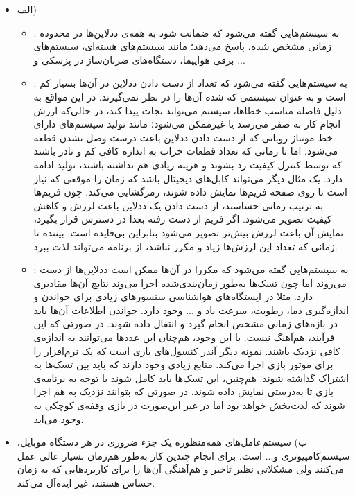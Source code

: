 

\begin{itemize}
	\item الف)
	\begin{itemize}
		\item {}: به سیستم‌هایی گفته می‌شود که ضمانت شود به همه‌ی ددلاین‌ها در محدوده زمانی مشخص شده، پاسخ می‌دهد؛ مانند سیستم‌های هسته‌ای، سیستم‌های برقی هواپیما، دستگاه‌های ضربان‌ساز در پزسکی و ...
		\item {}:
		به سیستم‌هایی گفته می‌شود که تعداد از دست دادن ددلاین‌ در آن‌ها بسیار کم است و به عنوان سیستمی که  شده آن‌ها را در نظر نمی‌گیرند.  در این مواقع به دلیل فاصله مناسب خطاها، سیستم می‌تواند نجات پیدا کند، در حالی‌که ارزش انجام کار به صفر می‌رسد یا غیرممکن می‌شود؛ مانند تولید سیستم‌های دارای خط مونتاژ روباتی که از دست دادن ددلاین باعث درست وصل نشدن قطعه می‌شود. اما تا زمانی که تعداد قطعات خراب به اندازه کافی کم و نادر باشند که  توسط کنترل کیفیت رد بشوند و هزینه زیادی هم نداشته باشند، تولید ادامه دارد. یک مثال دیگر می‌تواند کابل‌های دیجیتال  باشد که زمان را موقعی که نیاز است تا روی صفحه فریم‌ها نمایش داده شوند، رمزگشایی می‌کند. چون فریم‌ها به ترتیب زمانی حساسند، از دست دادن یک ددلاین باعث لرزش و کاهش کیفیت تصویر می‌شود. اگر فریم از دست رفته بعدا در دسترس قرار بگیرد، نمایش آن باعث لرزش بیش‌تر تصویر می‌شود بنابراین بی‌فایده است. بیننده تا زمانی که تعداد این لرزش‌ها زیاد و مکرر نباشد، از برنامه می‌تواند لذت ببرد.
		\item {}:
		به سیستم‌هایی گفته می‌شود که مکررا در آن‌ها ممکن است ددلاین‌ها از دست می‌روند اما چون تسک‌ها به‌طور زمان‌بندی‌شده اجرا می‌وند نتایج آن‌ها مقادیری دارد. 
		مثلا در ایستگاه‌های هواشناسی سنسورهای زیادی برای خواندن و اندازه‌گیری دما، رطوبت، سرعت باد و ... وجود دارد. خواندن اطلاعات آن‌ها باید در بازه‌های زمانی مشخص انجام گیرد و انتقال داده شوند. در صورتی که این فرآیند، هم‌آهنگ نیست. با این وجود، هم‌چنان این عددها می‌توانند به اندازه‌ی کافی نزدیک باشند. نمونه دیگر  آندر کنسول‌های بازی است که یک نرم‌افزار را برای موتور بازی اجرا می‌کند. منابع زیادی وجود دارند که باید بین تسک‌ها به اشتراک گذاشته شوند. هم‌چنین، این تسک‌ها باید کامل شوند با توجه به برنامه‌ی بازی تا به‌درستی نمایش داده شوند. در صورتی که بتوانند نزدیک به هم اجرا شوند که لذت‌بخش خواهد بود اما در غیر این‌صورت در بازی وقفه‌ی کوچکی به وجود می‌‌آید. 
	\end{itemize}

	\item ب) 
	سیستم‌عامل‌های همه‌منظوره یک جزء ضروری در هر دستگاه موبایل، سیستم‌کامپیوتری و... است. برای انجام چندین کار به‌طور هم‌زمان بسیار عالی عمل می‌کنند ولی مشکلاتی نظیر تاخیر و هم‌آهنگی آن‌ها را برای کاربردهایی که به زمان حساس هستند، غیر ایده‌آل می‌کند.
	

\end{itemize}
